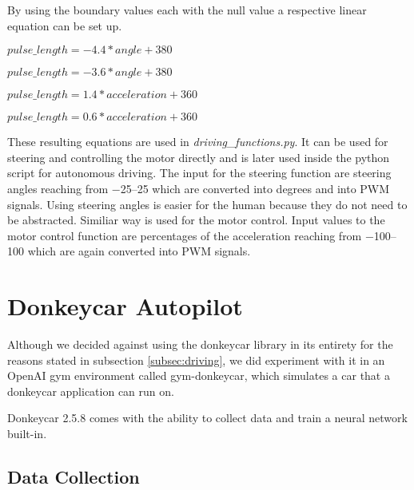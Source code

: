 \documentclass[conference]{IEEEtran}
\begin{document}
By using the boundary values each with the null value a respective linear equation can be set up.
\begin{description}
\setlength\itemsep{.25em}
\item[Left] $ pulse\_length = -4.4 * angle + 380 $
\item[Right] $ pulse\_length = -3.6 * angle + 380 $
\item[Forwards] $ pulse\_length = 1.4 * acceleration + 360 $
\item[Backwards] $ pulse\_length = 0.6 * acceleration + 360 $
\end{description}
These resulting equations are used in \textit{driving\_functions.py}.
It can be used for steering and controlling the motor directly and is later used inside the python script for autonomous driving.
The input for the steering function are steering angles reaching from \numrange{-25}{25} which are converted into degrees and into PWM signals.
Using steering angles is easier for the human because they do not need to be abstracted.
Similiar way is used for the motor control.
Input values to the motor control function are percentages of the acceleration reaching from \numrange{-100}{100} which are again converted into PWM signals.


\section{Donkeycar Autopilot}

Although we decided against using the donkeycar library in its entirety for the reasons stated in subsection \ref{subsec:driving}, we did experiment with it in an OpenAI gym environment called gym-donkeycar, which simulates a car that a donkeycar application can run on.

Donkeycar 2.5.8 comes with the ability to collect data and train a neural network built-in.

\subsection{Data Collection}
\end{document}
